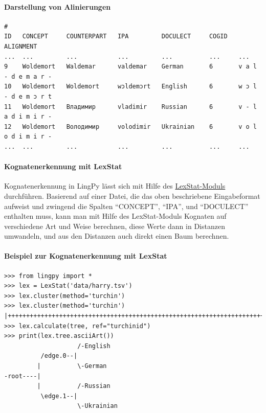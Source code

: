 \paragraph{Darstellung von Alinierungen}

\begin{verbatim}
#
ID   CONCEPT     COUNTERPART   IPA         DOCULECT     COGID   ALIGNMENT  
...  ...         ...           ...         ...          ...     ...  
9    Woldemort   Waldemar      valdemar    German       6       v a l - d e m a r -
10   Woldemort   Woldemort     wɔldemɔrt   English      6       w ɔ l - d e m ɔ r t 
11   Woldemort   Владимир      vladimir    Russian      6       v - l a d i m i r -
12   Woldemort   Володимир     volodimir   Ukrainian    6       v o l o d i m i r -
...  ...         ...           ...         ...          ...     ...  
\end{verbatim}


\paragraph{Kognatenerkennung mit LexStat}

Kognatenerkennung in LingPy lässt sich mit Hilfe des
\href{http://lingpy.org/reference/lingpy.compare.html\#module-lingpy.compare.lexstat}{LexStat-Moduls}
durchführen. Basierend auf einer Datei, die das oben beschriebene
Eingabeformat aufweist und zwingend die Spalten ``CONCEPT'', ``IPA'',
und ``DOCULECT'' enthalten muss, kann man mit Hilfe des LexStat-Moduls
Kognaten auf verschiedene Art und Weise berechnen, diese Werte dann in
Distanzen umwandeln, und aus den Distanzen auch direkt einen Baum
berechnen.


\paragraph{Beispiel zur Kognatenerkennung mit LexStat}

\begin{verbatim}
>>> from lingpy import *
>>> lex = LexStat('data/harry.tsv')
>>> lex.cluster(method='turchin')
>>> lex.cluster(method='turchin')
|++++++++++++++++++++++++++++++++++++++++++++++++++++++++++++++++++++++++++++++++++++++++++++++++++++|
>>> lex.calculate(tree, ref="turchinid")
>>> print(lex.tree.asciiArt())
                    /-English
          /edge.0--|
         |          \-German
-root----|
         |          /-Russian
          \edge.1--|
                    \-Ukrainian
\end{verbatim}




